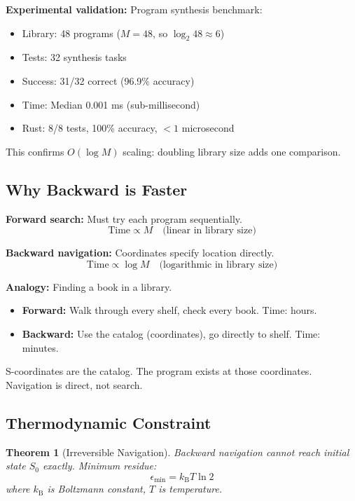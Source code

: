 \documentclass[twocolumn,10pt]{article}
\newtheorem{theorem}{Theorem}[section]
\theoremstyle{definition}
\theoremstyle{remark}
\newcommand{\kB}{k_{\text{B}}}
\begin{document}
\vspace{0.2cm}
\noindent\textbf{Experimental validation:} Program synthesis benchmark:
\begin{itemize}
\item Library: 48 programs ($M = 48$, so $\log_2 48 \approx 6$)
\item Tests: 32 synthesis tasks
\item Success: 31/32 correct (96.9\% accuracy)
\item Time: Median 0.001 ms (sub-millisecond)
\item Rust: 8/8 tests, 100\% accuracy, $<1$ microsecond
\end{itemize}

This confirms $O(\log M)$ scaling: doubling library size adds one comparison.

\subsection{Why Backward is Faster}

\textbf{Forward search:} Must try each program sequentially.
\begin{equation}
\text{Time} \propto M \quad \text{(linear in library size)}
\end{equation}

\textbf{Backward navigation:} Coordinates specify location directly.
\begin{equation}
\text{Time} \propto \log M \quad \text{(logarithmic in library size)}
\end{equation}

\vspace{0.2cm}
\noindent\textbf{Analogy:} Finding a book in a library.
\begin{itemize}
\item \textbf{Forward:} Walk through every shelf, check every book. Time: hours.
\item \textbf{Backward:} Use the catalog (coordinates), go directly to shelf. Time: minutes.
\end{itemize}

S-coordinates are the catalog. The program exists at those coordinates. Navigation is direct, not search.

\subsection{Thermodynamic Constraint}

\begin{theorem}[Irreversible Navigation]
\label{thm:irreversible}
Backward navigation cannot reach initial state $S_0$ exactly. Minimum residue:
\begin{equation}
\epsilon_{\min} = \kB T \ln 2
\end{equation}
where $\kB$ is Boltzmann constant, $T$ is temperature.
\end{theorem}
\end{document}
